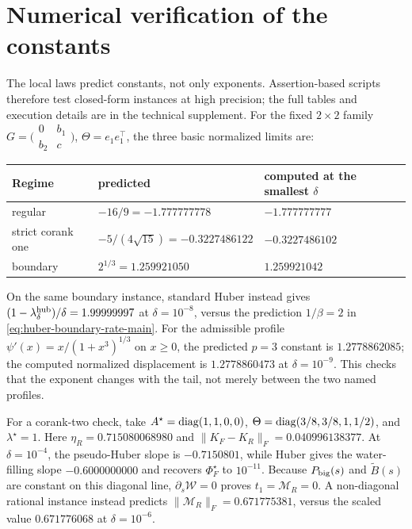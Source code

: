 \section{Numerical verification of the constants}
\label{sec:numerics}

The local laws predict constants, not only exponents.  Assertion-based scripts
therefore test closed-form instances at high precision; the full tables and
execution details are in the technical supplement.  For the fixed
\(2\times2\) family
\(G=\bigl(\begin{smallmatrix}0&b_1\\b_2&c\end{smallmatrix}\bigr)\),
\(\Theta=e_1e_1^\top\), the three basic normalized limits are:
\begin{center}
\begin{tabular}{@{}lll@{}}
\toprule
Regime & predicted & computed at the smallest \(\delta\)\\
\midrule
regular & \(-16/9=-1.777777778\) & \(-1.777777777\)\\
strict corank one & \(-5/(4\sqrt{15})=-0.3227486122\) & \(-0.3227486102\)\\
boundary & \(2^{1/3}=1.259921050\) & \(1.259921042\)\\
\bottomrule
\end{tabular}
\end{center}
On the same boundary instance, standard Huber instead gives
\((1-\lambda_\delta^{\rm hub})/\delta=1.99999997\) at
\(\delta=10^{-8}\), versus the prediction \(1/\beta=2\) in
\eqref{eq:huber-boundary-rate-main}.
For the admissible profile
\(\psi'(x)=x/(1+x^3)^{1/3}\) on \(x\ge0\), the predicted \(p=3\)
constant is \(1.2778862085\); the computed normalized displacement is
\(1.2778860473\) at \(\delta=10^{-9}\).  This checks that the exponent
changes with the tail, not merely between the two named profiles.

For a corank-two check, take
\(A^\star=\operatorname{diag}(1,1,0,0)\),
\(\Theta=\operatorname{diag}(3/8,3/8,1,1/2)\), and \(\lambda^\star=1\).
Here \(\eta_R=0.715080068980\) and
\(\|K_F-K_R\|_F=0.040996138377\).  At \(\delta=10^{-4}\), the
pseudo-Huber slope is \(-0.7150801\), while Huber gives the water-filling
slope \(-0.6000000000\) and recovers \(\Phi_F^\star\) to \(10^{-11}\).
Because \(P_{\rm big}(s)\) and \(\widetilde B(s)\) are constant on this
diagonal line, \(\partial_s\mathcal W=0\) proves
\(t_1=\mathcal M_R=0\).  A non-diagonal rational instance instead predicts
\(\|\mathcal M_R\|_F=0.671775381\), versus the scaled value
\(0.671776068\) at \(\delta=10^{-6}\).

